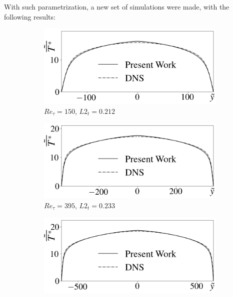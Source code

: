 \documentclass[10pt]{article} %
\begin{document}
With such parametrization, a new set of simulations were made, with the following results:

\begin{figure}[!h]
	\centering
	\begin{subfigure}[t]{0.5\textwidth}
		\centering
		\includegraphics[angle=0, scale=0.24]{fotos_formatacao_final/Temperature_150_071_Prt(Ret)_Avelocity}
		\caption{$Re_\tau = 150$, $L2_t = 0.212$}
	\end{subfigure}
	\begin{subfigure}[t]{0.45\textwidth}
		\centering
		\includegraphics[angle=0, scale=0.24]{fotos_formatacao_final/Temperature_395_071_Prt(Ret)_Avelocity}
		\caption{$Re_\tau = 395$, $L2_t = 0.233$}
	\end{subfigure}
	\begin{subfigure}[t]{0.5\textwidth}
		\centering
		\includegraphics[angle=0, scale=0.24]{fotos_formatacao_final/Temperature_640_071_Prt(Ret)_Avelocity}

\end{subfigure}
\end{figure}
\end{document}
